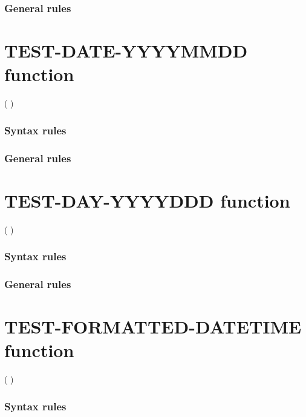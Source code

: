 \subsubsection{General rules}

\section{TEST-DATE-YYYYMMDD function}

\begin{syntax}
    ( \argument )
\end{syntax}

\subsubsection{Syntax rules}

\subsubsection{General rules}

\section{TEST-DAY-YYYYDDD function}

\begin{syntax}
    ( \argument )
\end{syntax}

\subsubsection{Syntax rules}

\subsubsection{General rules}

\section{TEST-FORMATTED-DATETIME function}

\begin{syntax}
    ( \argument \argument )
\end{syntax}

\subsubsection{Syntax rules}


